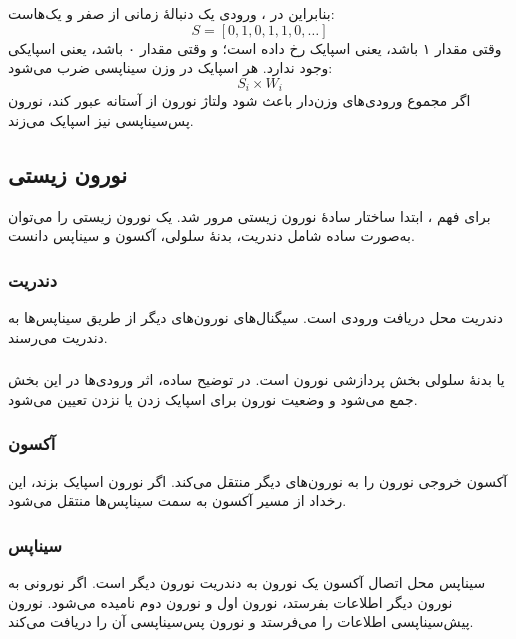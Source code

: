 بنابراین در ، ورودی یک دنبالهٔ زمانی از صفر و یک‌هاست:
\[
S = [0, 1, 0, 1, 1, 0, \ldots]
\]
وقتی مقدار ۱ باشد، یعنی اسپایک رخ داده است؛ و وقتی مقدار ۰ باشد، یعنی اسپایکی وجود ندارد. هر اسپایک در وزن سیناپسی ضرب می‌شود:
\[
S_i \times W_i
\]
اگر مجموع ورودی‌های وزن‌دار باعث شود ولتاژ نورون از آستانه عبور کند، نورون پس‌سیناپسی نیز اسپایک می‌زند.



\subsection{نورون زیستی}
برای فهم ، ابتدا ساختار سادهٔ نورون زیستی مرور شد. یک نورون زیستی را می‌توان به‌صورت ساده شامل دندریت، بدنهٔ سلولی، آکسون و سیناپس دانست.

\subsubsection{دندریت}
دندریت محل دریافت ورودی است. سیگنال‌های نورون‌های دیگر از طریق سیناپس‌ها به دندریت می‌رسند.

\subsubsection{}
 یا بدنهٔ سلولی بخش پردازشی نورون است. در توضیح ساده، اثر ورودی‌ها در این بخش جمع می‌شود و وضعیت نورون برای اسپایک زدن یا نزدن تعیین می‌شود.

\subsubsection{آکسون}
آکسون خروجی نورون را به نورون‌های دیگر منتقل می‌کند. اگر نورون اسپایک بزند، این رخداد از مسیر آکسون به سمت سیناپس‌ها منتقل می‌شود.

\subsubsection{سیناپس}
سیناپس محل اتصال آکسون یک نورون به دندریت نورون دیگر است. اگر نورونی به نورون دیگر اطلاعات بفرستد، نورون اول  و نورون دوم  نامیده می‌شود. نورون پیش‌سیناپسی اطلاعات را می‌فرستد و نورون پس‌سیناپسی آن را دریافت می‌کند.

